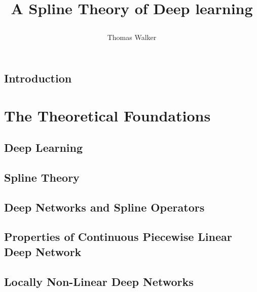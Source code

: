 \documentclass[nobib,oneside]{tufte-book}
\title{\parbox{\linewidth}{A Spline Theory of Deep learning}}
\author[]{Thomas Walker}
\begin{document}
\frontmatter

\maketitle

\tableofcontents

\chapter*{Introduction}

\mainmatter

\part{The Theoretical Foundations}\label{part:theoretical_foundations}

\chapter{Deep Learning}\label{ch:deep_learning}



\chapter{Spline Theory}\label{ch:spline_theory}



\chapter{Deep Networks and Spline Operators}\label{ch:deep_networks_spline_operators}



\chapter{Properties of Continuous Piecewise Linear Deep Network}



\chapter{Locally Non-Linear Deep Networks}


\end{document}
